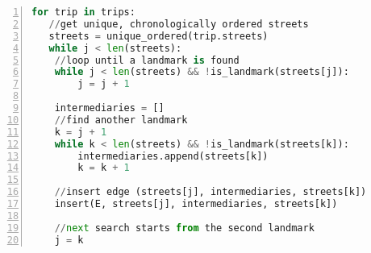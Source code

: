 \begin{lstlisting}[language = Python, caption = {Pseudocode for constructing landmark graph}, label = {List:code_ldmk_graph}, frame=single, numbers=left, stepnumber=1]
for trip in trips:
   //get unique, chronologically ordered streets
   streets = unique_ordered(trip.streets)
   while j < len(streets):
	//loop until a landmark is found
	while j < len(streets) && !is_landmark(streets[j]):
		j = j + 1
		
	intermediaries = []
	//find another landmark
	k = j + 1
	while k < len(streets) && !is_landmark(streets[k]):
		intermediaries.append(streets[k])
		k = k + 1
		
	//insert edge (streets[j], intermediaries, streets[k])
	insert(E, streets[j], intermediaries, streets[k])
		
	//next search starts from the second landmark
	j = k
\end{lstlisting}
